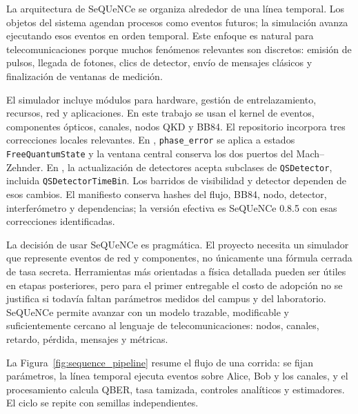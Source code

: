 La arquitectura de SeQUeNCe se organiza alrededor de una línea temporal. Los objetos del sistema agendan procesos como eventos futuros; la simulación avanza ejecutando esos eventos en orden temporal. Este enfoque es natural para telecomunicaciones porque muchos fenómenos relevantes son discretos: emisión de pulsos, llegada de fotones, clics de detector, envío de mensajes clásicos y finalización de ventanas de medición.

El simulador incluye módulos para hardware, gestión de entrelazamiento, recursos, red y aplicaciones. En este trabajo se usan el kernel de eventos, componentes ópticos, canales, nodos QKD y BB84. El repositorio incorpora tres correcciones locales relevantes. En , \texttt{phase\_error} se aplica a estados \texttt{FreeQuantumState} y la ventana central conserva los dos puertos del Mach--Zehnder. En , la actualización de detectores acepta subclases de \texttt{QSDetector}, incluida \texttt{QSDetectorTimeBin}. Los barridos de visibilidad y detector dependen de esos cambios. El manifiesto conserva hashes del flujo, BB84, nodo, detector, interferómetro y dependencias; la versión efectiva es SeQUeNCe 0.8.5 con esas correcciones identificadas.

La decisión de usar SeQUeNCe es pragmática. El proyecto necesita un simulador que represente eventos de red y componentes, no únicamente una fórmula cerrada de tasa secreta. Herramientas más orientadas a física detallada pueden ser útiles en etapas posteriores, pero para el primer entregable el costo de adopción no se justifica si todavía faltan parámetros medidos del campus y del laboratorio. SeQUeNCe permite avanzar con un modelo trazable, modificable y suficientemente cercano al lenguaje de telecomunicaciones: nodos, canales, retardo, pérdida, mensajes y métricas.

La Figura~\ref{fig:sequence_pipeline} resume el flujo de una corrida: se fijan parámetros, la línea temporal ejecuta eventos sobre Alice, Bob y los canales, y el procesamiento calcula QBER, tasa tamizada, controles analíticos y estimadores. El ciclo se repite con semillas independientes.

